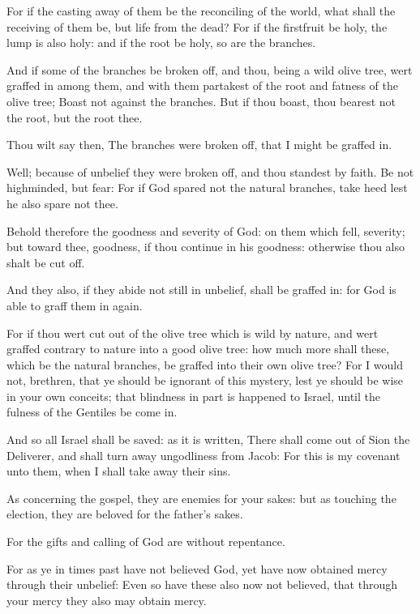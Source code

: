 \Verse For if the casting away of them be the reconciling of the world, what shall the receiving of them be, but life from the dead?  \Verse For if the firstfruit be holy, the lump is also holy: and if the root be holy, so are the branches.

\Verse And if some of the branches be broken off, and thou, being a wild olive tree, wert graffed in among them, and with them partakest of the root and fatness of the olive tree; \Verse Boast not against the branches. But if thou boast, thou bearest not the root, but the root thee.

\Verse Thou wilt say then, The branches were broken off, that I might be graffed in.

\Verse Well; because of unbelief they were broken off, and thou standest by faith. Be not highminded, but fear: \Verse For if God spared not the natural branches, take heed lest he also spare not thee.

\Verse Behold therefore the goodness and severity of God: on them which fell, severity; but toward thee, goodness, if thou continue in his goodness: otherwise thou also shalt be cut off.

\Verse And they also, if they abide not still in unbelief, shall be graffed in: for God is able to graff them in again.

\Verse For if thou wert cut out of the olive tree which is wild by nature, and wert graffed contrary to nature into a good olive tree: how much more shall these, which be the natural branches, be graffed into their own olive tree?  \Verse For I would not, brethren, that ye should be ignorant of this mystery, lest ye should be wise in your own conceits; that blindness in part is happened to Israel, until the fulness of the Gentiles be come in.

\Verse And so all Israel shall be saved: as it is written, There shall come out of Sion the Deliverer, and shall turn away ungodliness from Jacob: \Verse For this is my covenant unto them, when I shall take away their sins.

\Verse As concerning the gospel, they are enemies for your sakes: but as touching the election, they are beloved for the father's sakes.

\Verse For the gifts and calling of God are without repentance.

\Verse For as ye in times past have not believed God, yet have now obtained mercy through their unbelief: \Verse Even so have these also now not believed, that through your mercy they also may obtain mercy.

